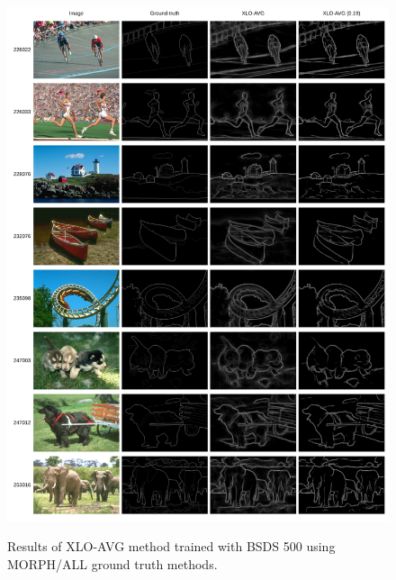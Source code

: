 \begin{figure}%
  \centering
  \caption{Results of XLO-AVG method trained with BSDS 500 using MORPH/ALL ground truth methods.}
  \includegraphics[width=1\columnwidth]{../imagens/apendice/appendix-horiz-09.png}
  \sourceOwn
  \label{fig:cap6_expr5_bsds_visual}
\end{figure}
